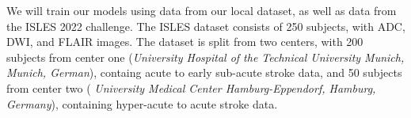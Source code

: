 \par We will train our models using data from our local dataset,
as well as data from the ISLES 2022 challenge. The ISLES dataset consists 
of 250 subjects, with ADC, DWI, and FLAIR images. The dataset is split from
two centers, with 200 subjects from center one (\emph{University Hospital of the Technical
 University Munich, Munich, German}), containg acute to early sub-acute stroke data,
 and 50 subjects from center two (\emph{ University Medical Center Hamburg-Eppendorf, Hamburg, Germany}), 
 containing hyper-acute to acute stroke data.